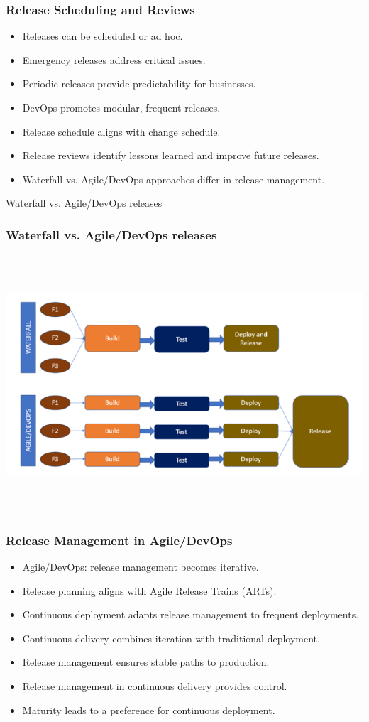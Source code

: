 \documentclass[aspectratio=169, table]{beamer}
\begin{document}
\begin{frame}
	\frametitle{Release Scheduling and Reviews}
	\begin{itemize}
		\item Releases can be scheduled or ad hoc.
		\item Emergency releases address critical issues.
		\item Periodic releases provide predictability for businesses.
		\item DevOps promotes modular, frequent releases.
		\item Release schedule aligns with change schedule.
		\item Release reviews identify lessons learned and improve future releases.
		\item Waterfall vs. Agile/DevOps approaches differ in release management.
	\end{itemize}
\end{frame}

\begin{frame}{Waterfall vs. Agile/DevOps releases} 	 \frametitle{Waterfall vs. Agile/DevOps releases} \begin{center} 	\includegraphics[width=0.8\linewidth]{images/image-02.png} \end{center} \end{frame}

\begin{frame}
	\frametitle{Release Management in Agile/DevOps}
	\begin{itemize}
		\item Agile/DevOps: release management becomes iterative.
		\item Release planning aligns with Agile Release Trains (ARTs).
		\item Continuous deployment adapts release management to frequent deployments.
		\item Continuous delivery combines iteration with traditional deployment.
		\item Release management ensures stable paths to production.
		\item Release management in continuous delivery provides control.
		\item Maturity leads to a preference for continuous deployment.
	\end{itemize}
\end{frame}
\end{document}

